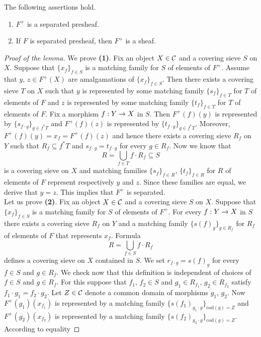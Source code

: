 \begin{lemma}\label{lemma:plusconstruction}
The following assertions hold.
\begin{enumerate}[label=\emph{\textbf{(\arabic*)}}, leftmargin=1.5em]
\item $F^+$ is a separated presheaf.
\item If $F$ is separated presheaf, then $F^+$ is a sheaf.
\end{enumerate} 
\end{lemma}
\begin{proof}[Proof of the lemma]
We prove \textbf{(1)}. Fix an object $X\in {\mathcal C}$ and a covering sieve $S$ on $X$. Suppose that $\{x_f\}_{f\in S}$ is a matching family for $S$ of elements of $F^+$. Assume that $y$, $z\in F^+(X)$ are amalgamations of $\{x_f\}_{f\in S}$. Then there exists a covering sieve $T$ on $X$ such that $y$ is represented by some matching family $\{s_f\}_{f\in T}$ for $T$ of elements of $F$ and $z$ is represented by some matching family $\{t_f\}_{f\in T}$ for $T$ of elements of $F$. Fix a morphism $f:Y\rightarrow X$ in $S$. Then $F^+(f)(y)$ is represented by $\{s_{f\cdot g}\}_{g\in f^*T}$ and $F^+(f)(z)$ is represented by $\{t_{f\cdot g}\}_{g\in f^*T}$. Moreover, $F^+(f)(y)=x_f=F^+(f)(z)$ and hence there exists a covering sieve $R_f$ on $Y$ such that $R_f\subseteq f^*T$ and $s_{f\cdot g}=t_{f\cdot g}$ for every $g\in R_f$. Now we know that 
$$R=\bigcup_{f\in T}f\cdot R_f\subseteq S$$
is a covering sieve on $X$ and matching families $\{s_f\}_{f\in R}$, $\{t_f\}_{f\in R}$ for $R$ of elements of $F$ represent respectively $y$ and $z$. Since these families are equal, we derive that $y=z$. This implies that $F^+$ is separated.\\
Let us prove \textbf{(2)}. Fix an object $X\in {\mathcal C}$ and a covering sieve $S$ on $X$. Suppose that $\{x_f\}_{f\in S}$ is a matching family for $S$ of elements of $F^+$. For every $f:Y\rightarrow X$ in $S$ there exists a covering sieve $R_f$ on $Y$ and a matching family $\{s(f)_g\}_{g\in R_f}$ for $R_f$ of elements of $F$ that represents $x_f$. Formula
$$R=\bigcup_{f\in S}f\cdot R_f$$
defines a covering sieve on $X$ contained in $S$. We set $r_{f\cdot g}=s(f)_g$ for every $f\in S$ and $g\in R_f$. We check now that this definition is independent of choices of $f\in S$ and $g\in R_f$. For this suppose that $f_1$, $f_2\in S$ and $g_1\in R_{f_1}$, $g_2\in R_{f_2}$ satisfy $f_1\cdot g_1=f_2\cdot g_2$. Let $Z\in {\mathcal C}$ denote a common domain of morphisms $g_1$, $g_2$. Now $F^+(g_1)(x_{f_1})$ is represented by a matching family $\{s(f_1)_{g_1\cdot g}\}_{\mathrm{cod}(g)=Z}$ and $F^+(g_2)(x_{f_2})$ is represented by a matching family $\{s(f_2)_{g_2\cdot g}\}_{\mathrm{cod}(g)=Z}$. According to equality

\end{proof}
